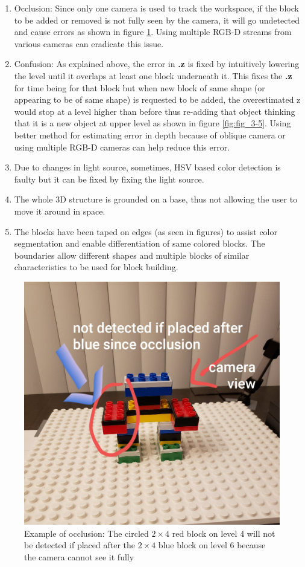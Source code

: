 \begin{enumerate}
    \item Occlusion: Since only one camera is used to track the workspace, if the block to be added or removed is not fully seen by the camera, it will go undetected and cause errors as shown in figure \ref{fig:fig_3-4}. Using multiple RGB-D streams from various cameras can eradicate this issue. 
    \item Confusion: As explained above, the error in \textbf{.z} is fixed by intuitively lowering the level until it overlaps at least one block underneath it. This fixes the \textbf{.z} for time being for that block but when new block of same shape (or appearing to be of same shape) is requested to be added, the overestimated z would stop at a level higher than before thus re-adding that object thinking that it is a new object at upper level as shown in figure \ref{fig:fig_3-5}. Using better method for estimating error in depth because of oblique camera or using multiple RGB-D cameras can help reduce this error.
    \item Due to changes in light source, sometimes, HSV based color detection is faulty but it can be fixed by fixing the light source.
    \item The whole 3D structure is grounded on a base, thus not allowing the user to move it around in space. 
    \item The blocks have been taped on edges (as seen in figures) to assist color segmentation and enable differentiation of same colored blocks. The boundaries allow different shapes and multiple blocks of similar characteristics to be used for block building. 
\end{enumerate}
\begin{figure}[h]
   \centering
   \includegraphics[scale=0.2]{figures/occlusion.jpg}
   \caption[{Example of occlusion}]{Example of occlusion: The circled $2 \times 4$ red block on level 4 will not be detected if placed after the $2 \times 4$ blue block on level 6 because the camera cannot see it fully}
   \label{fig:fig_3-4}
\end{figure}

